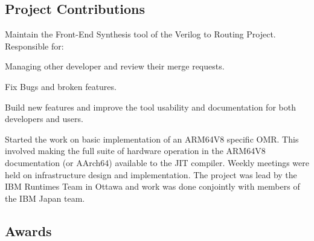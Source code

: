\documentclass[]{deedy-resume-openfont}
\begin{document}
\begin{flushleft}

\begin{samepage}
\section{Project Contributions}

\href{https://github.com/verilog-to-routing/vtr-verilog-to-routing/graphs/contributors}{}
Maintain the Front-End Synthesis tool of the Verilog to Routing Project.
Responsible for:
\begin{tightemize}
\item Managing other developer and review their merge requests.
\item Fix Bugs and broken features.
\item Build new features and improve the tool usability and documentation for both developers and users.
\end{tightemize}
\sectionsep
\end{samepage}

\begin{samepage}
\href{https://github.com/eclipse/omr}{}
Started the work on basic implementation of an ARM64V8 specific OMR. This involved making the full suite of hardware operation in the ARM64V8 documentation (or AArch64) available to the JIT compiler. Weekly meetings were held on infrastructure design and implementation. The project was lead by the IBM Runtimes Team in Ottawa and work was done conjointly with members of the IBM Japan team.
\sectionsep
\end{samepage}

\begin{samepage}
\section{Awards}

\sectionsep
\end{samepage}


\end{flushleft}
\end{document}
